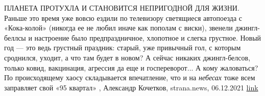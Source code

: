 ПЛАНЕТА ПРОТУХЛА И СТАНОВИТСЯ НЕПРИГОДНОЙ ДЛЯ ЖИЗНИ.  Раньше это время уже
вовсю ездили по телевизору светящиеся автопоезда с «Кока-колой» (никогда ее не
любил иначе как пополам с виски), звенели джингл-беллсы и настроение было
предпраздничное, хлопотное и слегка грустное.  Новый год — это ведь грустный
праздник: старый, уже привычный гол, с которым сроднился, уходит, а что там
будет в новом?  А сейчас никаких джингл-белсов, только ковид, вакцинация,
агрессия да еще и госпереворот... А кому жаловаться? По происходящему хаосу
складывается впечатление, что и на \emph{небесах} тоже всем заправляет свой «95
квартал»
, 
Александр Кочетков, strana.news, 06.12.2021
\href{https://strana.news/opinions/365703-takoe-vpechatlenie-chto-i-na-nebesakh-zapravljaet-svoj-95-j-kvartal.html}{link}
